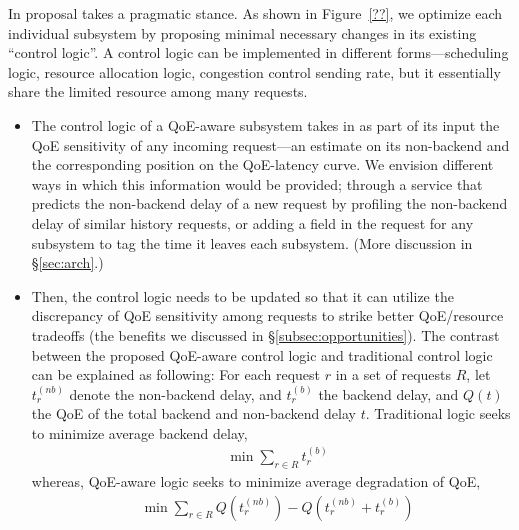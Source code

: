 In proposal takes a pragmatic stance. 
As shown in Figure~\ref{??}, we optimize each individual subsystem by proposing minimal necessary changes in its existing ``control logic''.
A control logic can be implemented in different forms---\eg scheduling logic, resource allocation logic, congestion control sending rate, but it essentially share the limited resource among many requests.
\begin{itemize}
    \item The control logic of a QoE-aware subsystem takes in as part of its input the QoE sensitivity of any incoming request---an estimate on its non-backend and the corresponding position on the QoE-latency curve. 
    We envision different ways in which this information would be provided; \eg through a service that predicts the non-backend delay of a new request by profiling the non-backend delay of similar history requests, or adding a field in the request for any subsystem to tag the time it leaves each subsystem. (More discussion in \S\ref{sec:arch}.)
    \item Then, the control logic needs to be updated so that it can utilize the discrepancy of QoE sensitivity among requests to strike better QoE/resource tradeoffs (\ie the benefits we discussed in \S\ref{subsec:opportunities}).
    The contrast between the proposed QoE-aware control logic and traditional control logic can be explained as following: 
    For each request $r$ in a set of requests $R$, let $t_{r}^{(nb)}$ denote the non-backend delay, and $t_{r}^{(b)}$ the backend delay, and $Q(t)$ the QoE of the total backend and non-backend delay $t$.
    Traditional logic seeks to minimize average backend delay, \ie
    \begin{align*}
        & \min \sum_{r\in R} t_{r}^{(b)}
    \end{align*}
    whereas, QoE-aware logic seeks to minimize average degradation of QoE, \ie
    \begin{align*}
        & \min \sum_{r\in R} Q(t_{r}^{(nb)})-Q(t_{r}^{(nb)}+t_{r}^{(b)})
    \end{align*}
\end{itemize}

